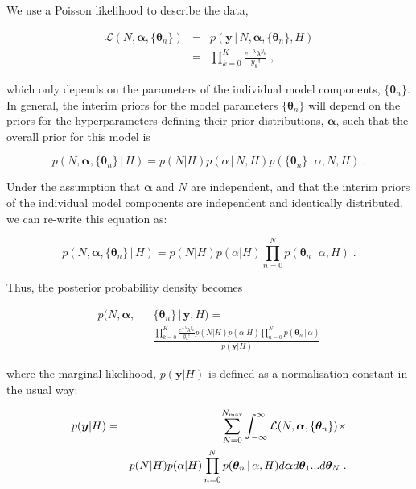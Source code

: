 \documentclass[12pt]{emulateapj}
\newcommand{\given}{\,|\,}
\newcommand{\counts}{y}
\newcommand{\likelihood}{{\mathcal L}}
\begin{document}
We use a Poisson likelihood to describe the data,

\begin{eqnarray}
\likelihood(N, \bm{\alpha}, \{\bm{\theta}_n \}) & = & p(\bm{\counts} \given N, \bm{\alpha}, \{\bm{\theta}_n \}, H) \\ \nonumber
 &= & \prod\limits_{k=0}^{K}{ \frac{e^{-\lambda} \lambda^{y_k} }{y_k! }} \; ,
\end{eqnarray}

which only depends on the parameters of the individual model components, $\{\bm{\theta}_n\}$. In general, the interim priors for the model 
parameters $\{\bm{\theta}_n\}$ will depend on the priors for the hyperparameters defining their prior distributions, $\bm{\alpha}$, such that the
overall prior for this model is

\begin{equation}
p(N, \bm{\alpha}, \{\bm{\theta}_n \} \given H) = p(N | H)p(\alpha\given N, H)p(\{\bm{\theta}_n\}\given \alpha, N, H) \; .
\end{equation}

Under the assumption that $\bm{\alpha}$ and $N$ are independent, and that the interim priors of the individual model components are
independent and identically distributed, we can re-write this equation as:

\begin{equation}
p(N, \bm{\alpha}, \{\bm{\theta}_n \} \given H) = p(N|H)p(\alpha|H) \prod\limits_{n=0}^{N}  p(\bm{\theta}_n\given \alpha, H) \; .
\end{equation}

Thus, the posterior probability density becomes

\begin{eqnarray}
p(N, \bm{\alpha}, &&\{\bm{\theta}_n \}  \given \bm{\counts}, H) = \\ 
&& \frac{\prod\limits_{k=0}^{K}{ \frac{e^{-\lambda} \lambda^{y_k} }{y_k! }} p(N|H)p(\alpha|H) \prod\limits_{n=0}^{N}  p(\bm{\theta}_n\given \alpha)}{p(\bm{\counts} | H)}  \nonumber
\end{eqnarray}

where the marginal likelihood, $p(\bm{\counts} | H)$ is defined as a normalisation constant in the usual way: 

\begin{eqnarray}
p(\bm{\counts} | H) & = & \sum_{N=0}^{N_{\rm max}} \int_{-\infty}^{\infty}{\likelihood(N, \bm{\alpha}, \{\bm{\theta}_n \})} \times \\ \nonumber
&& p(N|H)p(\alpha|H) \prod\limits_{n=0}^{N}  p(\bm{\theta}_n\given \alpha, H) d\bm{\alpha} d\bm{\theta}_1 ... d\bm{\theta}_N \; .
\label{eqn:marginal}
\end{eqnarray}
\end{document}
